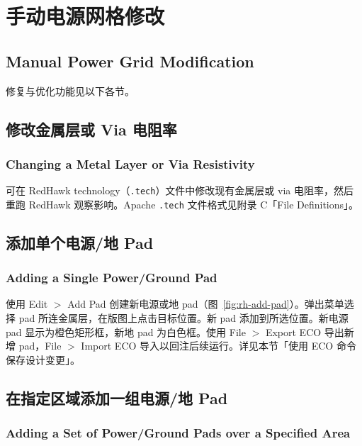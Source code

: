 \section{手动电源网格修改}
\subsection*{Manual Power Grid Modification}

修复与优化功能见以下各节。

\subsection{修改金属层或 Via 电阻率}
\subsubsection*{Changing a Metal Layer or Via Resistivity}

可在 RedHawk technology（\texttt{.tech}）文件中修改现有金属层或 via 电阻率，然后重跑 RedHawk 观察影响。Apache \texttt{.tech} 文件格式见附录 C「File Definitions」。

\subsection{添加单个电源/地 Pad}
\subsubsection*{Adding a Single Power/Ground Pad}

使用 Edit $>$ Add Pad 创建新电源或地 pad（图~\ref{fig:rh-add-pad}）。弹出菜单选择 pad 所连金属层，在版图上点击目标位置。新 pad 添加到所选位置。新电源 pad 显示为橙色矩形框，新地 pad 为白色框。使用 File $>$ Export ECO 导出新增 pad，File $>$ Import ECO 导入以回注后续运行。详见本节「使用 ECO 命令保存设计变更」。

\label{fig:rh-add-pad}

\subsection{在指定区域添加一组电源/地 Pad}
\subsubsection*{Adding a Set of Power/Ground Pads over a Specified Area}

